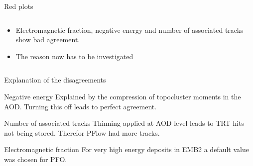 \begin{frame}{Red plots}
\begin{columns}
\begin{column}{0.5\textwidth}
            \begin{itemize}
                \item Electromagnetic fraction, negative energy and number of associated tracks show bad agreement.
                \item The reason now has to be investigated
            \end{itemize}
        \end{column}
    \end{columns}
\end{frame}

\begin{frame}{Explanation of the disagreements}
    \begin{block}{Negative energy}
        Explained by the compression of topocluster moments in the AOD. Turning this off leads to perfect agreement.
    \end{block}
    \begin{block}{Number of associated tracks}
        Thinning applied at AOD level leads to TRT hits not being stored. Therefor PFlow had more tracks.
    \end{block}
    \begin{block}{Electromagnetic fraction}
        For very high energy deposits in EMB2 a default value was chosen for PFO.
    \end{block}
\end{frame}

